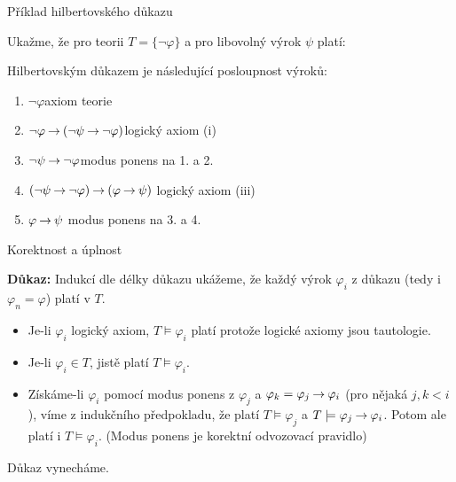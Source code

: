 \documentclass{beamer}
\begin{document}
\begin{frame}{Příklad hilbertovského důkazu}

    Ukažme, že pro teorii $T=\{\neg\varphi\}$ a pro libovolný výrok $\psi$ platí:  

    Hilbertovským důkazem je následující posloupnost výroků:
    
    \begin{enumerate}\it
        \item $\neg\varphi$\hfill axiom teorie
        \item $\neg \varphi \mathbin{\rightarrow} (\neg \psi \mathbin{\rightarrow} \neg \varphi)$\hfill logický axiom (i)
        \item $\neg \psi \mathbin{\rightarrow} \neg \varphi$\hfill modus ponens na 1. a 2.
        \item $(\neg \psi \mathbin{\rightarrow} \neg \varphi)\mathbin{\rightarrow}(\varphi \mathbin{\rightarrow} \psi)$ \hfill logický axiom (iii)
        \item $\varphi \mathbin{\rightarrow} \psi$ \hfill modus ponens na 3. a 4.
    \end{enumerate}    

\end{frame}


\begin{frame}{Korektnost a úplnost}


    \medskip

    \textbf{Důkaz:} Indukcí dle délky důkazu ukážeme, že každý výrok $\varphi_i$ z důkazu (tedy i $\varphi_n=\varphi$) platí v $T$.
    \begin{itemize}
        \item Je-li $\varphi_i$ logický axiom, $T \models \varphi_i$ platí protože logické axiomy jsou tautologie.
        \item Je-li $\varphi_i\in T$, jistě platí $T \models \varphi_i$.
        \item Získáme-li $\varphi_i$ pomocí modus ponens z $\varphi_j$ a $\varphi_k=\varphi_j\mathbin{\rightarrow}\varphi_i$ (pro nějaká $j,k<i$), víme z indukčního předpokladu, že platí $T \models \varphi_j$ a $T \models \varphi_j\mathbin{\rightarrow}\varphi_i$. Potom ale platí i $T \models \varphi_i$. (Modus ponens je \alert{korektní} odvozovací pravidlo)\hfill\qedsymbol
    \end{itemize}


    Důkaz vynecháme.
    
\end{frame}
\end{document}
